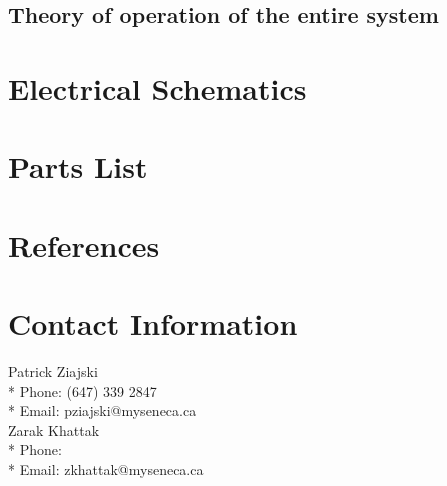 \documentclass[a4paper,12pt]{article}
\begin{document}
\subsection{Theory of operation of the entire system}

\newpage
\appendix
\section{Electrical Schematics}
\section{Parts List}
\section{References}

\newpage
\section{Contact Information}
\begin{center}
    Patrick Ziajski \\*
    Phone: (647) 339 2847 \\*
    Email: pziajski@myseneca.ca \\
    \vspace{5mm}
    Zarak Khattak \\*
    Phone: \\*
    Email: zkhattak@myseneca.ca
\end{center}

\end{document}
